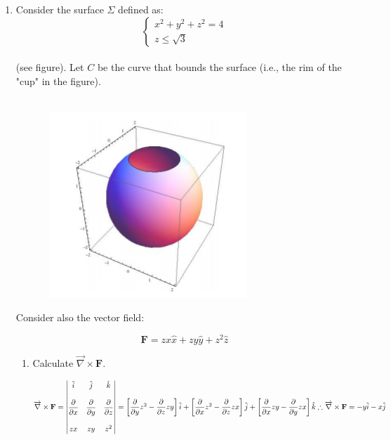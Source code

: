 \documentclass[fleqn]{article}
\begin{document}
  \begin{enumerate}
    \item Consider the surface $\Sigma$ defined as: \\
      $$\begin{cases}
        x^2+y^2+z^2=4 \\
        z \leq \sqrt{3}
      \end{cases}$$ \\
      (see figure). Let $C$ be the curve that bounds the surface (i.e., the rim of the "cup" in the figure). \\
      \\
      \begin{center}
        \includegraphics[height=7cm, width=10cm]{first.png}
      \end{center}

      Consider also the vector field:

      $$\mathbf{F}=zx \hat{x}+zy \hat{y}+z^2 \hat{z}$$
      \begin{enumerate}
        \item Calculate $\overrightarrow{\nabla} \times \mathbf{F}$.

          \textcolor{hwColor}{
            $
              \overrightarrow{\nabla} \times \mathbf{F}=\begin{vmatrix}
                \hat{i} & \hat{j} & \hat{k} \\
                \\
                \dfrac{\partial}{\partial x} & \dfrac{\partial}{\partial y} & \dfrac{\partial}{\partial z} \\
                \\
                zx & zy & z^2
              \end{vmatrix}=\left[\dfrac{\partial}{\partial y}z^2-\dfrac{\partial}{\partial z}zy\right]\hat{i}+\left[\dfrac{\partial}{\partial x}z^2-\dfrac{\partial}{\partial z}zx\right]\hat{j}+\left[\dfrac{\partial}{\partial x} zy-\dfrac{\partial}{\partial y}zx\right]\hat{k} \\
              \\
              \\
              \therefore \overrightarrow{\nabla} \times \mathbf{F}=-y \hat{i}-x\hat{j}
            $
          }


\end{enumerate}
\end{enumerate}
\end{document}
